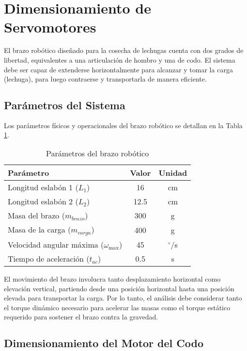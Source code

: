 \section{Dimensionamiento de Servomotores}

El brazo robótico diseñado para la cosecha de lechugas cuenta con dos grados de libertad, equivalentes a una articulación de hombro y una de codo. El sistema debe ser capaz de extenderse horizontalmente para alcanzar y tomar la carga (lechuga), para luego contraerse y transportarla de manera eficiente.

\subsection{Parámetros del Sistema}

Los parámetros físicos y operacionales del brazo robótico se detallan en la Tabla \ref{tab:parametros_brazo}.

\begin{table}[htbp]
\centering
\caption{Parámetros del brazo robótico}
\label{tab:parametros_brazo}
\begin{tabular}{lcc}
\hline
\textbf{Parámetro} & \textbf{Valor} & \textbf{Unidad} \\
\hline
Longitud eslabón 1 ($L_1$) & 16 & cm \\
Longitud eslabón 2 ($L_2$) & 12.5 & cm \\
Masa del brazo ($m_{brazo}$) & 300 & g \\
Masa de la carga ($m_{carga}$) & 400 & g \\
Velocidad angular máxima ($\omega_{\max}$) & 45 & $^{\circ}$/s \\
Tiempo de aceleración ($t_{ac}$) & 0.5 & s \\
\hline
\end{tabular}
\end{table}

El movimiento del brazo involucra tanto desplazamiento horizontal como elevación vertical, partiendo desde una posición horizontal hasta una posición elevada para transportar la carga. Por lo tanto, el análisis debe considerar tanto el torque dinámico necesario para acelerar las masas como el torque estático requerido para sostener el brazo contra la gravedad.

\subsection{Dimensionamiento del Motor del Codo}

